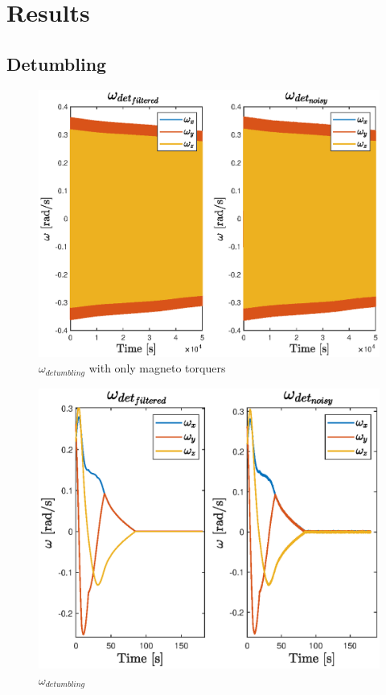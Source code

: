\documentclass[11pt]{article}
\begin{document}
\section{Results}\label{results}
\subsection{Detumbling}
\begin{minipage}{0.5\textwidth}
\begin{figure} [H]
\centering 
\includegraphics[scale=0.5]{w_magneto.eps}
\caption{ $\omega_{detumbling}$ with  only  magneto  torquers}

\end{figure}
\end{minipage}
\begin{minipage}{0.5\textwidth}
 \begin{figure} [H]
\centering 
\includegraphics[scale=0.6]{w_det_cold_gas.eps}
\caption{ $\omega_{detumbling}$}
\label{CG}
\end{figure}
\end{minipage}\\\
 
\end{document}
